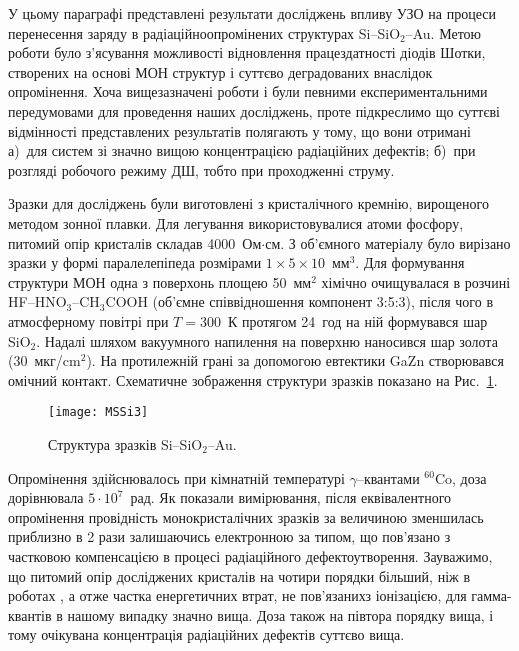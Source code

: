 \documentclass[a4paper,14pt,oneside,openany]{memoir}
\begin{document}
У цьому параграфі представлені результати досліджень впливу УЗО на процеси перенесення заряду в радіаційноопромінених структурах Si--SiO$_2$--Au.
Метою роботи було з'ясування можливості відновлення працездатності діодів Шотки, створених на основі МОН структур і суттєво деградованих внаслідок опромінення.
Хоча вищезазначені роботи \cite{Parchinskii2000r,Parchinskii2006r} і були певними експериментальними передумовами для проведення наших досліджень, проте
підкреслимо що суттєві відмінності представлених результатів полягають у тому, що вони отримані
а)~для систем зі значно вищою концентрацією радіаційних дефектів;
б)~при розгляді робочого режиму ДШ, тобто при проходженні струму.



Зразки для досліджень були виготовлені з кристалічного кремнію, вирощеного методом зонної плавки. 
Для легування використовувалися атоми фосфору, питомий опір кристалів складав 4000~Ом$\cdot$см.
З об'ємного матеріалу було вирізано зразки у формі паралелепіпеда розмірами $1\times5\times10$~мм$^3$.
Для формування структури МОН одна з поверхонь площею 50~мм$^2$ хімічно очищувалася в розчині HF--HNO$_3$--CH$_3$COOH (об'ємне співвідношення компонент 3:5:3),
після чого в атмосферному повітрі при $T=300$~К протягом 24~год на ній формувався шар SiO$_2$.
Надалі шляхом вакуумного напилення на поверхню наносився шар золота (30~мкг/cm$^2$).
На протилежній грані за допомогою евтектики GaZn створювався омічний контакт.
Схематичне зображення структури зразків показано на Рис.~\ref{figMSSi3}.

\begin{figure}[b]
\center
\texttt{[image: MSSi3]}%
\caption{\label{figMSSi3}
Структура зразків Si--SiO$_2$--Au.
}
\end{figure}

Опромінення здійснювалось при кімнатній температурі $\gamma$--квантами $^{60}$Co, доза дорівнювала $5\cdot10^7$~рад.
Як показали вимірювання, після еквівалентного опромінення провідність монокристалічних зразків за величиною зменшилась приблизно в 2 рази залишаючись електронною за типом,
що пов'язано з частковою компенсацією в процесі радіаційного дефектоутворення.
Зауважимо, що питомий опір досліджених кристалів на чотири порядки більший, ніж в роботах \cite{Parchinskii2000r,Parchinskii2006r}, а отже частка енергетичних втрат, не пов'язанихз іонізацією, для гамма-квантів в нашому випадку значно вища.
Доза також на півтора порядку вища, і тому очікувана концентрація радіаційних дефектів суттєво вища.
\end{document}
